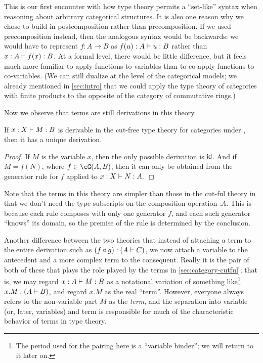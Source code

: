 This is our first encounter with how type theory permits a ``set-like'' syntax when reasoning about arbitrary categorical structures.
It is also one reason why we chose to build in postcomposition rather than precomposition.
If we used precomposition instead, then the analogous syntax would be backwards: we would have to represent $f:A\to B$ as $f(u):A \vdash u:B$ rather than $x:A \vdash f(x):B$.
At a formal level, there would be little difference, but it feels much more familiar to apply functions to variables than to co-apply functions to co-variables.
(We can still dualize at the level of the categorical models; we already mentioned in \cref{sec:intro} that we could apply the type theory of categories with finite products to the opposite of the category of commutative rings.)

Now we observe that terms are still derivations in this theory.

\begin{lem}
  If $x:X \vdash M:B$ is derivable in the cut-free type theory for categories under \cG, then it has a unique derivation.
\end{lem}
\begin{proof}
  If $M$ is the variable $x$, then the only possible derivation is $\mathsf{id}$.
  And if $M = f(N)$, where $f\in\cG(A,B)$, then it can only be obtained from the generator rule for $f$ applied to $x:X \vdash N:A$.
\end{proof}

Note that the terms in this theory are simpler than those in the cut-ful theory in that we don't need the type subscripts on the composition operation $\comp{A}$.
This is because each rule composes with only one generator $f$, and each such generator ``knows'' its domain, so the premise of the rule is determined by the conclusion.

Another difference between the two theories that instead of attaching a term to the entire derivation such as $(f\circ g): (A\vdash C)$, we now attach a variable to the antecedent and a more complex term to the consequent.
Really it is the pair of both of these that plays the role played by the terms in \cref{sec:category-cutful}; that is, we may regard $x:A \vdash M:B$ as a notational variation of something like\footnote{The period used for the pairing here is a ``variable binder''; we will return to it later on.} $x.M:(A\vdash B)$, and regard $x.M$ as the real ``term''.
However, everyone always refers to the non-variable part $M$ as the \emph{term}, and the separation into variable (or, later, variables) and term is responsible for much of the characteristic behavior of terms in type theory.

